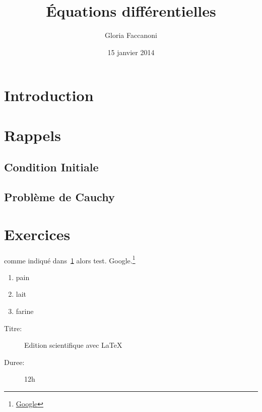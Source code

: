 \documentclass[10pt,a4paper]{scrartcl}
\title{Équations différentielles}
\author{Gloria Faccanoni}
\date{15 janvier 2014}
\begin{document}
\maketitle
\lipsum[10]
\tableofcontents
\section*{Introduction}
\lipsum[1-2]
\section{Rappels}\label{rapp}
\lipsum[3]
\subsection{Condition Initiale}
\lipsum[4]
\subsection{Problème de Cauchy}
\lipsum[5]
\section{Exercices}
\lipsum[6]
comme indiqué dans~\ref{rapp} alors test.
Google.\footnote{\href{http://www.google.com}{Google}}

\begin{enumerate}
\item pain
\item lait
\item farine
\end{enumerate}

\begin{description}
\item[Titre:]Edition scientifique avec \LaTeX
\item[Duree:]12h
\end{description}
\end{document}
